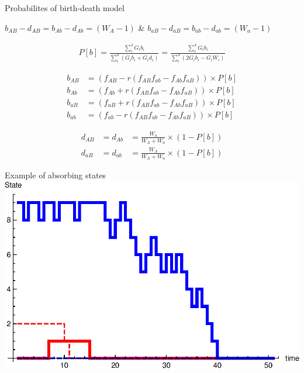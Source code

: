\documentclass{beamer}
\begin{document}
\begin{frame}{Probabilites of birth-death model}

    $b_{AB}-d_{AB} = b_{Ab}-d_{Ab}=(W_A-1)$ \& $b_{aB}-d_{aB} = b_{ab}-d_{ab}=(W_a-1)$
    
    \begin{equation*}
    \begin{aligned}
        P[b] = \frac{\sum_i^4 G_i b_i}{\sum_i^4 (G_i b_i + G_i d_i)} = \frac{\sum_i^4 G_i b_i}{\sum_i^4 (2 G_i b_i - G_i W_i)}
    \end{aligned}
    \end{equation*}
    
    \begin{equation*}
    \begin{aligned}
        b_{AB} &= (f_{AB}-r(f_{AB}f_{ab}-f_{Ab}f_{aB}))\times P[b]\\
        b_{Ab} &= (f_{Ab}+r(f_{AB}f_{ab}-f_{Ab}f_{aB}))\times P[b]\\
        b_{aB} &= (f_{aB}+r(f_{AB}f_{ab}-f_{Ab}f_{aB}))\times P[b]\\
        b_{ab} &= (f_{ab}-r(f_{AB}f_{ab}-f_{Ab}f_{aB}))\times P[b]
    \end{aligned}
    \end{equation*} 
    
    \begin{equation*}
    \begin{aligned}
        d_{AB} &= d_{Ab} &= \frac{W_a}{W_A+W_a}\times (1-P[b]) \\
        d_{aB} &= d_{ab} &= \frac{W_A}{W_A+W_a}\times (1-P[b]) 
    \end{aligned}
    \end{equation*}
    
  
    
\end{frame}

\begin{frame}{Example of absorbing states}
    \includegraphics[width=1.0\textwidth]{Matlab/data/Realization1.eps}
\end{frame}
\end{document}

